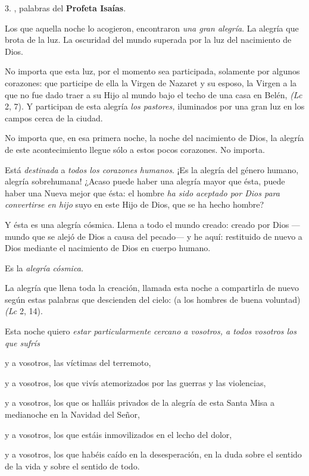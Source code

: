 \begin{body}
\begin{body}
3. , palabras del \textbf{Profeta Isaías}.

Los que aquella noche lo acogieron, encontraron \emph{una gran alegría}. La alegría que brota de la luz. La oscuridad del mundo superada por la luz del nacimiento de Dios.

No importa que esta luz, por el momento sea participada, solamente por algunos corazones: que participe de ella la Virgen de Nazaret y su esposo, la Virgen a la que no fue dado traer a su Hijo al mundo bajo el techo de una casa en Belén, \emph{(Lc} 2, 7). Y participan de esta alegría \emph{los pastores,} iluminados por una gran luz en los campos cerca de la ciudad.

No importa que, en esa primera noche, la noche del nacimiento de Dios, la alegría de este acontecimiento llegue sólo a estos pocos corazones. No importa.

Está \emph{destinada} a \emph{todos los corazones humanos}. ¡Es la alegría del género humano, alegría sobrehumana! ¿Acaso puede haber una alegría mayor que ésta, puede haber una Nueva mejor que ésta: el hombre \emph{ha sido aceptado por Dios para convertirse en hijo} suyo en este Hijo de Dios, que se ha hecho hombre?

Y ésta es una alegría cósmica. Llena a todo el mundo creado: creado por Dios ---mundo que se alejó de Dios a causa del pecado--- y he aquí: restituido de nuevo a Dios mediante el nacimiento de Dios en cuerpo humano.

Es la \emph{alegría cósmica. }

La alegría que llena toda la creación, llamada esta noche a compartirla de nuevo según estas palabras que descienden del cielo:  (a los hombres de buena voluntad) \emph{(Lc} 2, 14).

Esta noche quiero \emph{estar particularmente cercano a vosotros, a todos vosotros los que sufrís }

y a vosotros, las víctimas del terremoto,

y a vosotros, los que vivís atemorizados por las guerras y las violencias,

y a vosotros, los que os halláis privados de la alegría de esta Santa Misa a medianoche en la Navidad del Señor,

y a vosotros, los que estáis inmovilizados en el lecho del dolor,

y a vosotros, los que habéis caído en la desesperación, en la duda sobre el sentido de la vida y sobre el sentido de todo.


\end{body}
\end{body}
